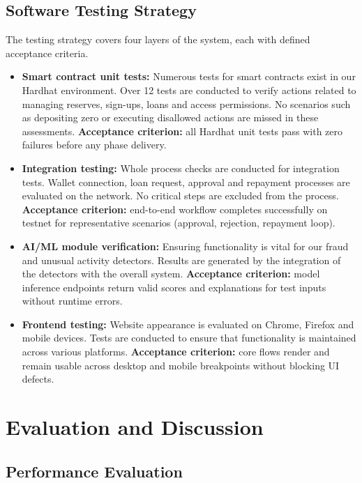\documentclass[12pt, a4paper]{report}
\begin{document}
\section{Software Testing Strategy}

The testing strategy covers four layers of the system, each with defined acceptance criteria.

\begin{itemize}[noitemsep]
\item \textbf{Smart contract unit tests:} Numerous tests for smart contracts exist in our Hardhat environment. Over 12 tests are conducted to verify actions related to managing reserves, sign-ups, loans and access permissions. No scenarios such as depositing zero or executing disallowed actions are missed in these assessments. \textbf{Acceptance criterion:} all Hardhat unit tests pass with zero failures before any phase delivery.
\item \textbf{Integration testing:} Whole process checks are conducted for integration tests. Wallet connection, loan request, approval and repayment processes are evaluated on the network. No critical steps are excluded from the process. \textbf{Acceptance criterion:} end-to-end workflow completes successfully on testnet for representative scenarios (approval, rejection, repayment loop).
\item \textbf{AI/ML module verification:} Ensuring functionality is vital for our fraud and unusual activity detectors. Results are generated by the integration of the detectors with the overall system. \textbf{Acceptance criterion:} model inference endpoints return valid scores and explanations for test inputs without runtime errors.
\item \textbf{Frontend testing:} Website appearance is evaluated on Chrome, Firefox and mobile devices. Tests are conducted to ensure that functionality is maintained across various platforms. \textbf{Acceptance criterion:} core flows render and remain usable across desktop and mobile breakpoints without blocking UI defects.
\end{itemize}

\chapter{Evaluation and Discussion}

\section{Performance Evaluation}
\label{sec:performance-eval}
\label{sec:cost-model}
\label{sec:gas-cost}
\end{document}
